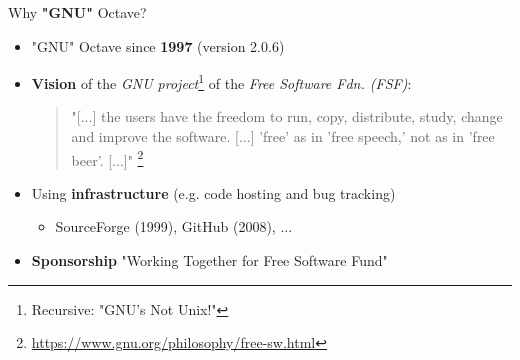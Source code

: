 \begin{frame}{Why \textbf{"GNU"} Octave?}

\begin{itemize}
\itemsep1.5em
\item
"GNU" Octave since \textbf{1997} (version 2.0.6)

\item
\textbf{Vision} of the
\textit{GNU project}\footnote{Recursive: "GNU's Not Unix!"}
of the \textit{Free Software Fdn. (FSF)}:\\[1em]

\begin{quotation}
"[...] the users have the freedom to run, copy, distribute, study, change
and improve the software. [...] 'free' as in 'free speech,'
not as in 'free beer'. [...]"
\footnote{\url{https://www.gnu.org/philosophy/free-sw.html}}
\end{quotation}

\item
Using \textbf{infrastructure} (e.g. code hosting and bug tracking)
\begin{itemize}
\item
SourceForge (1999), GitHub (2008), ...
\end{itemize}

\item
\textbf{Sponsorship} "Working Together for Free Software Fund"
\end{itemize}
\end{frame}
